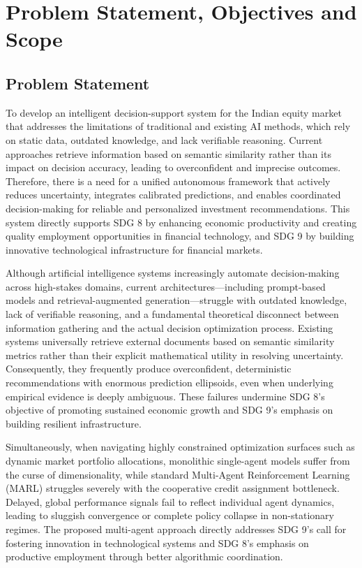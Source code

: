 \documentclass[12pt,a4paper,oneside]{report}
\theoremstyle{definition}
\theoremstyle{remark}
\begin{document}
\chapter{Problem Statement, Objectives and Scope}

\section{Problem Statement}

To develop an intelligent decision-support system for the Indian equity market that addresses the limitations of traditional and existing AI methods, which rely on static data, outdated knowledge, and lack verifiable reasoning. Current approaches retrieve information based on semantic similarity rather than its impact on decision accuracy, leading to overconfident and imprecise outcomes. Therefore, there is a need for a unified autonomous framework that actively reduces uncertainty, integrates calibrated predictions, and enables coordinated decision-making for reliable and personalized investment recommendations. This system directly supports SDG 8 by enhancing economic productivity and creating quality employment opportunities in financial technology, and SDG 9 by building innovative technological infrastructure for financial markets.

\medskip

Although artificial intelligence systems increasingly automate decision-making across high-stakes domains, current architectures---including prompt-based models and retrieval-augmented generation---struggle with outdated knowledge, lack of verifiable reasoning, and a fundamental theoretical disconnect between information gathering and the actual decision optimization process. Existing systems universally retrieve external documents based on semantic similarity metrics rather than their explicit mathematical utility in resolving uncertainty. Consequently, they frequently produce overconfident, deterministic recommendations with enormous prediction ellipsoids, even when underlying empirical evidence is deeply ambiguous. These failures undermine SDG 8's objective of promoting sustained economic growth and SDG 9's emphasis on building resilient infrastructure.

Simultaneously, when navigating highly constrained optimization surfaces such as dynamic market portfolio allocations, monolithic single-agent models suffer from the curse of dimensionality, while standard Multi-Agent Reinforcement Learning (MARL) struggles severely with the cooperative credit assignment bottleneck. Delayed, global performance signals fail to reflect individual agent dynamics, leading to sluggish convergence or complete policy collapse in non-stationary regimes. The proposed multi-agent approach directly addresses SDG 9's call for fostering innovation in technological systems and SDG 8's emphasis on productive employment through better algorithmic coordination.
\end{document}
